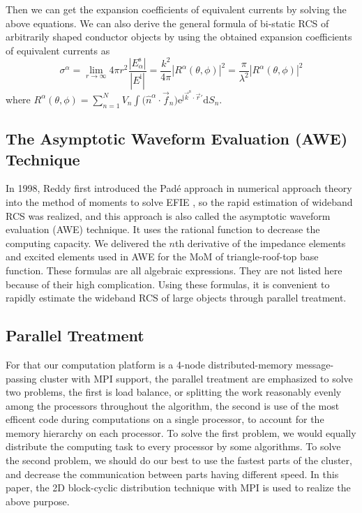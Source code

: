 \documentclass[conference, a4paper]{IEEEtran}
\begin{document}
Then we can get the expansion coefficients of equivalent currents by solving 
the above equations. We can also derive the general formula of bi-static RCS 
of arbitrarily shaped conductor objects by using the obtained expansion 
coefficients of equivalent currents as
\begin{equation}
\sigma ^\alpha =\lim\limits_{r\to \infty } 4\pi r^2\frac{\left| 
{E_\alpha^\mathrm{s}} \right|}{\left| {E^\mathrm{i}} \right|}=\frac{k^2}{4\pi }\left| 
{R^\alpha (\theta ,\phi )} \right|^2=\frac{\pi }{\lambda ^2}\left| {R^\alpha 
(\theta ,\phi )} \right|^2
\end{equation}
where $R^\alpha (\theta ,\phi )=\sum\limits_{n=1}^N {V_n \int {(\hat 
{n}^\alpha \cdot 
\vec{f} _n } 
)\mathrm{e}^{\mathrm{j}\vec{k} ^\mathrm{s}\cdot 
\vec{r}'}\mathrm{d}S_n } $.

\subsection{The Asymptotic Waveform Evaluation (AWE) Technique}

In 1998, Reddy first introduced the Pad\'{e} approach in numerical 
approach theory into the method of moments to solve EFIE \cite{reddy:fast_rcs:1998}, so the rapid 
estimation of wideband RCS was realized, and this approach is also called 
the asymptotic waveform evaluation (AWE) technique. It uses the rational 
function to decrease the computing capacity. We delivered the $n$th derivative 
of the impedance elements and excited elements used in AWE for the MoM of 
triangle-roof-top base function. These formulas are all algebraic 
expressions. They are not listed here because of their high complication. 
Using these formulas, it is convenient to rapidly estimate the wideband RCS 
of large objects through parallel treatment.

\subsection{Parallel Treatment }

For that our computation platform is a 4-node distributed-memory message-passing cluster with MPI support, the parallel treatment are emphasized to solve two problems\cite{Wilkinson:parallel:2002}, the first is 
load balance, or splitting the work reasonably evenly among the processors throughout the algorithm, the second is use of the most efficent code during computations on a single processor, to account for the memory hierarchy on each processor. To solve the first problem, we would equally 
distribute the computing task to every processor by some algorithms. To 
solve the second problem, we should do our best to use the fastest parts of 
the cluster, and decrease the communication between parts having different 
speed. In this paper, the 2D block-cyclic distribution technique with MPI is 
used to realize the above purpose\cite{blackford:slug:1997}.
\end{document}
